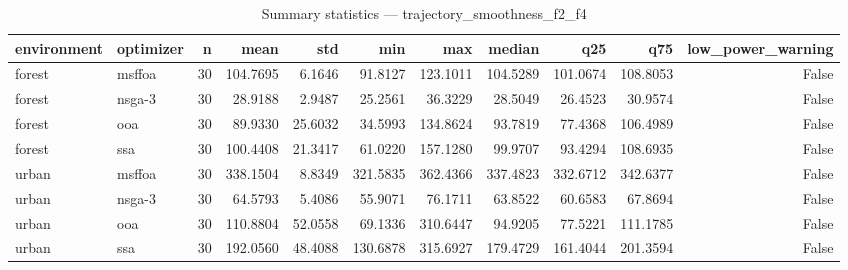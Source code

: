 \begin{table}
\caption{Summary statistics — trajectory_smoothness_f2_f4}
\label{tab:summary-trajectory_smoothness_f2_f4}
\begin{tabular}{llrrrrrrrrr}
\toprule
environment & optimizer & n & mean & std & min & max & median & q25 & q75 & low\_power\_warning \\
\midrule
forest & msffoa & 30 & 104.7695 & 6.1646 & 91.8127 & 123.1011 & 104.5289 & 101.0674 & 108.8053 & False \\
forest & nsga-3 & 30 & 28.9188 & 2.9487 & 25.2561 & 36.3229 & 28.5049 & 26.4523 & 30.9574 & False \\
forest & ooa & 30 & 89.9330 & 25.6032 & 34.5993 & 134.8624 & 93.7819 & 77.4368 & 106.4989 & False \\
forest & ssa & 30 & 100.4408 & 21.3417 & 61.0220 & 157.1280 & 99.9707 & 93.4294 & 108.6935 & False \\
urban & msffoa & 30 & 338.1504 & 8.8349 & 321.5835 & 362.4366 & 337.4823 & 332.6712 & 342.6377 & False \\
urban & nsga-3 & 30 & 64.5793 & 5.4086 & 55.9071 & 76.1711 & 63.8522 & 60.6583 & 67.8694 & False \\
urban & ooa & 30 & 110.8804 & 52.0558 & 69.1336 & 310.6447 & 94.9205 & 77.5221 & 111.1785 & False \\
urban & ssa & 30 & 192.0560 & 48.4088 & 130.6878 & 315.6927 & 179.4729 & 161.4044 & 201.3594 & False \\
\bottomrule
\end{tabular}
\end{table}
